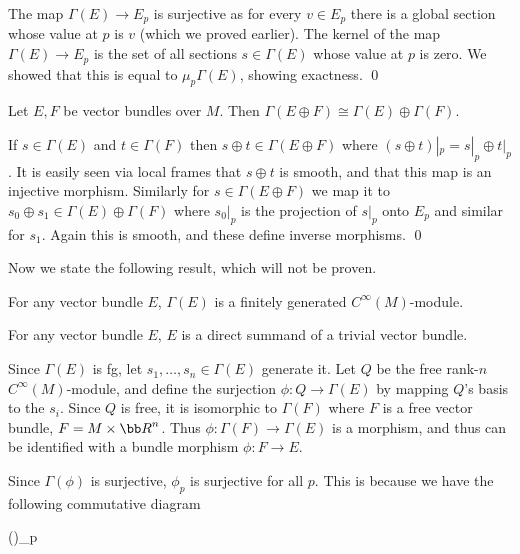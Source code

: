     The map $\Gamma(E)\to E_p$ is surjective as for every $v\in E_p$ there is a global section whose value at $p$ is $v$ (which we proved earlier).
    The kernel of the map $\Gamma(E)\to E_p$ is the set of all sections $s\in\Gamma(E)$ whose value at $p$ is zero.
    We showed that this is equal to $\mu_p\Gamma(E)$, showing exactness.
    \qed

\eproof

\blemm

    Let $E,F$ be vector bundles over $M$.
    Then $\Gamma(E\oplus F)\cong\Gamma(E)\oplus\Gamma(F)$.

\elemm

\bproof

    If $s\in\Gamma(E)$ and $t\in\Gamma(F)$ then $s\oplus t\in\Gamma(E\oplus F)$ where $(s\oplus t)|_p=s|_p\oplus t|_p$.
    It is easily seen via local frames that $s\oplus t$ is smooth, and that this map is an injective morphism.
    Similarly for $s\in\Gamma(E\oplus F)$ we map it to $s_0\oplus s_1\in\Gamma(E)\oplus\Gamma(F)$ where $s_0|_p$ is the projection of $s|_p$ onto $E_p$
    and similar for $s_1$.
    Again this is smooth, and these define inverse morphisms.
    \qed

\eproof

Now we state the following result, which will not be proven.

\blemm

    For any vector bundle $E$, $\Gamma(E)$ is a finitely generated $C^\infty(M)$-module.

\elemm

\blemm

    For any vector bundle $E$, $E$ is a direct summand of a trivial vector bundle.

\elemm

\bproof

    Since $\Gamma(E)$ is fg, let $s_1,\dots,s_n\in\Gamma(E)$ generate it.
    Let $Q$ be the free rank-$n$ $C^\infty(M)$-module, and define the surjection $\phi\colon Q\to\Gamma(E)$ by mapping $Q$'s basis to the $s_i$.
    Since $Q$ is free, it is isomorphic to $\Gamma(F)$ where $F$ is a free vector bundle, $F=M\times\bR^n$.
    Thus $\phi\colon\Gamma(F)\to\Gamma(E)$ is a morphism, and thus can be identified with a bundle morphism $\phi\colon F\to E$.

    Since $\Gamma(\phi)$ is surjective, $\phi_p$ is surjective for all $p$.
    This is because we have the following commutative diagram

        {}{}{\Gamma(\phi)}{\phi_p}


